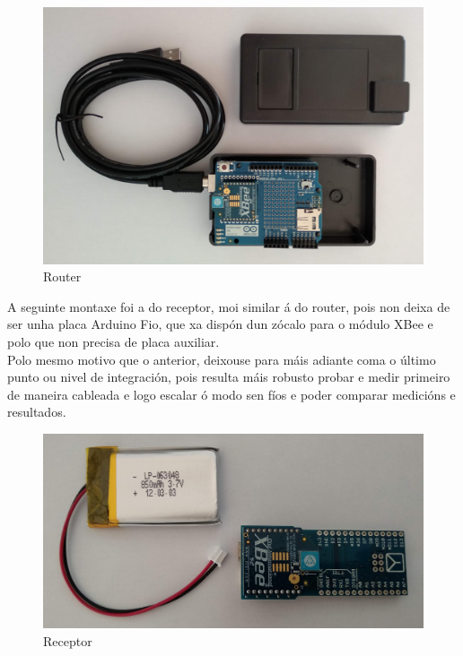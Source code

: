    \begin{figure}[htbp]
    \centering
    \includegraphics[scale=0.15,keepaspectratio=true]{./imagenes/router.jpg}
    \caption{Router}
    \label{figura:Router}
   \end{figure}
   
   A seguinte montaxe foi a do receptor, moi similar á do router, pois non deixa
   de ser unha placa Arduino Fio, que xa dispón dun zócalo para o módulo XBee e
   polo que non precisa de placa auxiliar. \\
   
   Polo mesmo motivo que o anterior, deixouse para máis adiante coma o último
   punto ou nivel de integración, pois resulta máis robusto probar e medir
   primeiro de maneira cableada e logo escalar ó modo sen fíos e poder comparar
   medicións e resultados. \\
  
   \begin{figure}[htbp]
    \centering
    \includegraphics[scale=0.15,keepaspectratio=true]{./imagenes/receptor.jpg}
    \caption{Receptor}
    \label{figura:Receptor}
   \end{figure}
   
